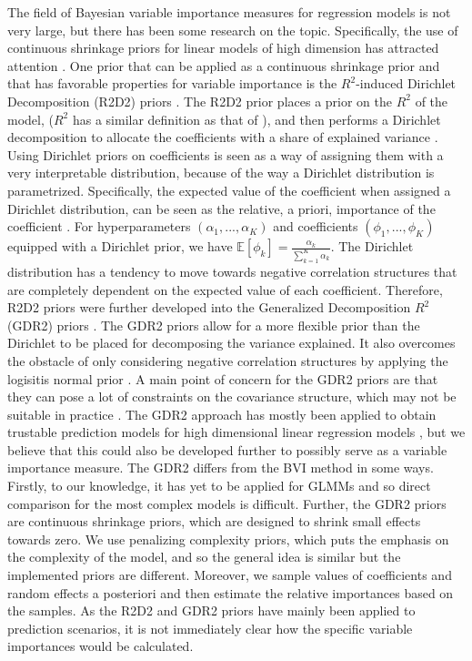 The field of Bayesian variable importance measures for regression models is not very large, but there has been some research on the topic. Specifically, the use of continuous shrinkage priors for linear models of high dimension has attracted attention \citep{aguilar2024generalized}. One prior that can be applied as a continuous shrinkage prior and that has favorable properties for variable importance is the $R^2$-induced Dirichlet Decomposition (R2D2) priors \citep{zhang2020bayesian}. The R2D2 prior places a prior on the $R^2$ of the model, ($R^2$ has a similar definition as that of \citet{gelman2017rsquared}), and then performs a Dirichlet decomposition to allocate the coefficients with a share of explained variance \citep{aguilar2024generalized}. Using Dirichlet priors on coefficients is seen as a way of assigning them with a very interpretable distribution, because of the way a Dirichlet distribution is parametrized. Specifically, the expected value of the coefficient when assigned a Dirichlet distribution, can be seen as the relative, a priori, importance of the coefficient \citep{aguilar2024generalized}. For hyperparameters $(\alpha_1, ..., \alpha_K)$ and coefficients $(\phi_1, ..., \phi_K)$ equipped with a Dirichlet prior, we have $\mathbb{E}[\phi_k]=\frac{\alpha_k}{\sum_{k=1}^K\alpha_k}$. The Dirichlet distribution has a tendency to move towards negative correlation structures that are completely dependent on the expected value of each coefficient. Therefore, R2D2 priors were further developed into the Generalized Decomposition $R^2$ (GDR2) priors \citep{aguilar2024generalized}. The GDR2 priors allow for a more flexible prior than the Dirichlet to be placed for decomposing the variance explained. It also overcomes the obstacle of only considering negative correlation structures by applying the logisitis normal prior \citep{aguilar2024generalized}. A main point of concern for the GDR2 priors are that they can pose a lot of constraints on the covariance structure, which may not be suitable in practice \citep[and references therein]{aguilar2024generalized}. The GDR2 approach has mostly been applied to obtain trustable prediction models for high dimensional linear regression models \citep{aguilar2024generalized}, but we believe that this could also be developed further to possibly serve as a variable importance measure. The GDR2 differs from the BVI method in some ways. Firstly, to our knowledge, it has yet to be applied for GLMMs and so direct comparison for the most complex models is difficult. Further, the GDR2 priors are continuous shrinkage priors, which are designed to shrink small effects towards zero. We use penalizing complexity priors, which puts the emphasis on the complexity of the model, and so the general idea is similar but the implemented priors are different. Moreover, we sample values of coefficients and random effects a posteriori and then estimate the relative importances based on the samples. As the R2D2 and GDR2 priors have mainly been applied to prediction scenarios, it is not immediately clear how the specific variable importances would be calculated. 

